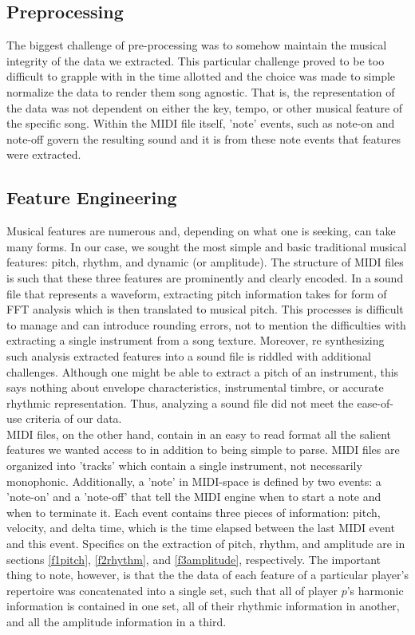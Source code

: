 \documentclass[conference]{IEEEtran}
\begin{document}
\subsection{Preprocessing}
The biggest challenge of pre-processing was to somehow maintain the musical integrity of the data we extracted. This particular challenge proved to be too difficult to grapple with in the time allotted and the choice was made to simple normalize the data to render them song agnostic. That is, the representation of the data was not dependent on either the key, tempo, or other musical feature of the specific song. Within the MIDI file itself, 'note' events, such as note-on and note-off govern the resulting sound and it is from these note events that features were extracted.\\

\subsection{Feature Engineering} \label{Feature Engineering}
Musical features are numerous and, depending on what one is seeking, can take many forms. In our case, we sought the most simple and basic traditional musical features: pitch, rhythm, and dynamic (or amplitude). The structure of MIDI files is such that these three features are prominently and clearly encoded. In a sound file that represents a waveform, extracting pitch information takes for form of FFT analysis which is then translated to musical pitch. This processes is difficult to manage and can introduce rounding errors, not to mention the difficulties with extracting a single instrument from a song texture. Moreover, re synthesizing such analysis extracted features into a sound file is riddled with additional challenges. Although one might be able to extract a pitch of an instrument, this says nothing about envelope characteristics, instrumental timbre, or accurate rhythmic representation. Thus, analyzing a sound file did not meet the ease-of-use criteria of our data.\\

MIDI files, on the other hand, contain in an easy to read format all the salient features we wanted access to in addition to being simple to parse. MIDI files are organized into 'tracks' which contain a single instrument, not necessarily monophonic. Additionally, a 'note' in MIDI-space is defined by two events: a 'note-on' and a 'note-off' that tell the MIDI engine when to start a note and when to terminate it. Each event contains three pieces of information: pitch, velocity, and delta time, which is the time elapsed between the last MIDI event and this event. Specifics on the extraction of pitch, rhythm, and amplitude are in sections \ref{f1pitch}, \ref{f2rhythm}, and \ref{f3amplitude}, respectively. The important thing to note, however, is that the the data of each feature of a particular player's repertoire was concatenated into a single set, such that all of player $p$'s harmonic information is contained in one set, all of their rhythmic information in another, and all the amplitude information in a third.\\
\end{document}
